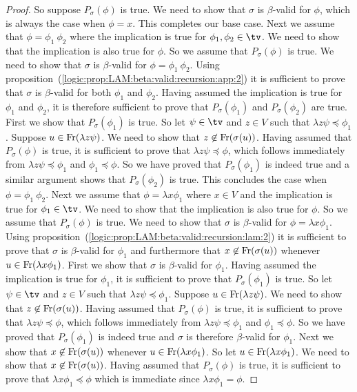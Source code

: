 \begin{proof}
    So suppose $P_{\sigma}(\phi)$ is true. We need to show that $\sigma$ is 
    $\beta$-valid for $\phi$, which is always the case when $\phi=x$. This 
    completes our base case.
    Next we assume that $\phi=\phi_{1}\ \phi_{2}$ where the implication is true
    for $\phi_{1},\phi_{2}\in\tv$. We need to show that the implication is also 
    true for $\phi$. So we assume that $P_{\sigma}(\phi)$ is true. We need to 
    show that $\sigma$ is $\beta$-valid for $\phi=\phi_{1}\ \phi_{2}$. Using
    proposition~(\ref{logic:prop:LAM:beta:valid:recursion:app:2}) it is 
    sufficient to prove that $\sigma$ is $\beta$-valid for both $\phi_{1}$
    and $\phi_{2}$. Having assumed the implication is true for $\phi_{1}$
    and $\phi_{2}$, it is therefore sufficient to prove that 
    $P_{\sigma}(\phi_{1})$ and $P_{\sigma}(\phi_{2})$ are true. First we 
    show that $P_{\sigma}(\phi_{1})$ is true. So let $\psi\in\tv$ and 
    $z\in V$ such that $\lambda z\psi\preceq\phi_{1}$. Suppose
    $u\in\mbox{\rm Fr}(\lambda z\psi)$. We need to show that $z\not\in\mbox{\rm Fr}(\sigma(u))$.
    Having assumed that $P_{\sigma}(\phi)$ is true, it is sufficient to prove
    that $\lambda z\psi\preceq\phi$, which follows immediately from 
    $\lambda z\psi\preceq\phi_{1}$ and $\phi_{1}\preceq\phi$. So we have proved
    that $P_{\sigma}(\phi_{1})$ is indeed true and a similar argument shows that
    $P_{\sigma}(\phi_{2})$ is true. This concludes the case when $\phi=\phi_{1}\
    \phi_{2}$. Next we assume that $\phi=\lambda x\phi_{1}$ where $x\in V$ and 
    the implication is true for $\phi_{1}\in\tv$. We need to show that the 
    implication is also true for $\phi$. So we assume that $P_{\sigma}(\phi)$
    is true. We need to show that $\sigma$ is $\beta$-valid for $\phi=
    \lambda x\phi_{1}$. Using 
    proposition~(\ref{logic:prop:LAM:beta:valid:recursion:lam:2}) it is sufficient
    to prove that $\sigma$ is $\beta$-valid for $\phi_{1}$ and furthermore that
    $x\not\in\mbox{\rm Fr}(\sigma(u))$ whenever $u\in\mbox{\rm Fr}(\lambda x\phi_{1})$. First
    we show that $\sigma$ is $\beta$-valid for $\phi_{1}$. Having assumed the
    implication is true for $\phi_{1}$, it is sufficient to prove that 
    $P_{\sigma}(\phi_{1})$ is true. So let $\psi\in\tv$ and $z\in V$ such that
    $\lambda z\psi\preceq\phi_{1}$. Suppose $u\in\mbox{\rm Fr}(\lambda z\psi)$. We 
    need to show that $z\not\in\mbox{\rm Fr}(\sigma(u))$. Having assumed that
    $P_{\sigma}(\phi)$ is true, it is sufficient to prove that $\lambda z\psi
    \preceq\phi$, which follows immediately from $\lambda z\psi\preceq\phi_{1}$
    and $\phi_{1}\preceq\phi$. So we have proved that $P_{\sigma}(\phi_{1})$ is
    indeed true and $\sigma$ is therefore $\beta$-valid for $\phi_{1}$.
    Next we show that $x\not\in\mbox{\rm Fr}(\sigma(u))$ whenever $u\in\mbox{\rm Fr}(\lambda
    x\phi_{1})$. So let $u\in\mbox{\rm Fr}(\lambda x\phi_{1})$. We need to show that 
    $x\not\in\mbox{\rm Fr}(\sigma(u))$. Having assumed that $P_{\sigma}(\phi)$ is 
    true, it is sufficient to prove that $\lambda x\phi_{1}\preceq\phi$ which
    is immediate since $\lambda x\phi_{1}=\phi$.
\end{proof}

